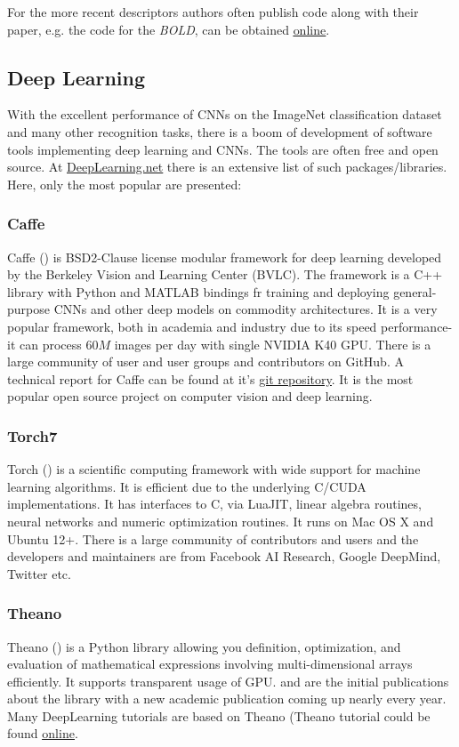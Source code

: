 {For the more recent descriptors authors often publish code along with their paper, e.g. the code for the {\em BOLD}, \cite{Balntas_2015_CVPR} can be obtained \href{http://vbalnt.io/projects/bold/}{\underline{online}}.

\subsection{Deep Learning}\label{soft:DL:subsec}
With the excellent performance of CNNs on the ImageNet classification dataset and many other recognition tasks, there is a boom of development of software tools implementing deep learning and CNNs. 
The tools are often free and open source. At \href{http://deeplearning.net/software_links/}{\underline{DeepLearning.net}} there is an extensive list of such packages/libraries. Here, only the most popular are presented:
\subsubsection{Caffe}
Caffe (\cite{caffe_soft}) is BSD2-Clause license modular framework for deep learning developed by the Berkeley Vision and Learning Center (BVLC). The framework is a C++ library with Python and MATLAB bindings fr training and deploying general-purpose CNNs and other deep models on commodity architectures. It is a very popular framework, both in academia and industry due to its speed performance- it can process $60M$ images per day with single NVIDIA K40 GPU. There is a large community of user and user groups and contributors on GitHub. A technical report for Caffe can be found at it's \href{https://github.com/BVLC/Caffe/}{\underline{git repository}}. It is the most popular open source project on computer vision and deep learning.  
\subsubsection{Torch7}
Torch (\cite{torch_soft}) is a scientific computing framework with wide support for machine learning algorithms. It is efficient due to the underlying C/CUDA implementations. It has interfaces to C, via LuaJIT, linear algebra routines, neural networks and numeric optimization routines. It runs on Mac OS X and Ubuntu 12+. There is a large community of contributors and users and the developers and maintainers are from Facebook AI Research, Google DeepMind, Twitter etc. 
\subsubsection{Theano}
Theano (\cite{theano_soft}) is a Python library allowing you definition, optimization, and evaluation of mathematical expressions involving multi-dimensional arrays efficiently. It supports transparent usage of GPU. \cite{bergstra+al:2010-scipy} and \cite{Bastien-Theano-2012} are the initial publications about the library with a new academic publication coming up nearly every year. Many DeepLearning tutorials are based on Theano (Theano tutorial could be found \href{http://deeplearning.net/software/theano/tutorial/}{\underline{online}}.
}
